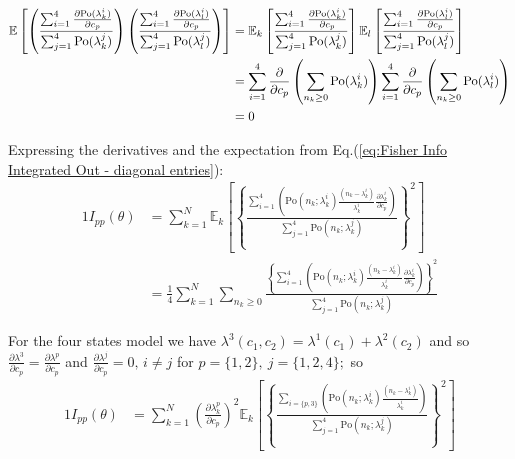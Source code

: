 \begin{alignat*}{1}
	\mathbb{E}\left[\left(\frac{\sum_{i=1}^{4}\frac{\partial\textrm{Po}(\textrm{\ensuremath{\lambda}}_{k}^{i})}{\partial c_{p}}}{\sum_{j=1}^{4}\textrm{Po}(\lambda_{k}^{j})}\right)\left(\frac{\sum_{i=1}^{4}\frac{\partial\textrm{Po}(\textrm{\ensuremath{\lambda}}_{l}^{i})}{\partial c_{p}}}{\sum_{j=1}^{4}\textrm{Po}(\lambda_{l}^{j})}\right)\right] & =\mathbb{E}_{k}\left[\frac{\sum_{i=1}^{4}\frac{\partial\textrm{Po}(\textrm{\ensuremath{\lambda}}_{k}^{i})}{\partial c_{p}}}{\sum_{j=1}^{4}\textrm{Po}(\lambda_{k}^{j})}\right]\mathbb{E}_{l}\left[\frac{\sum_{i=1}^{4}\frac{\partial\textrm{Po}(\textrm{\ensuremath{\lambda}}_{l}^{i})}{\partial c_{p}}}{\sum_{j=1}^{4}\textrm{Po}(\lambda_{l}^{j})}\right]\\
	 & =\sum_{i=1}^{4}\frac{\partial}{\partial c_{p}}\left(\sum_{n_{k}\geq0}\textrm{Po}(\textrm{\ensuremath{\lambda}}_{k}^{i})\right)\sum_{i=1}^{4}\frac{\partial}{\partial c_{p}}\left(\sum_{n_{k}\geq0}\textrm{Po}(\textrm{\ensuremath{\lambda}}_{l}^{i})\right)\\
	 & =0	
\end{alignat*}

Expressing the derivatives and the expectation from Eq.(\ref{eq:Fisher Info Integrated Out - diagonal entries}):
%
\begin{alignat*}{1}
	I_{pp}(\theta) & =\sum_{k=1}^{N}\mathbb{E}_{k}\left[\left\{ \frac{\sum_{i=1}^{4}\left(\mathrm{Po}(n_{k};\lambda_{k}^{i})\frac{(n_{k}-\lambda_{k}^{i})}{\lambda_{k}^{i}}\frac{\partial\lambda_{k}^{i}}{\partial c_{p}}\right)}{\sum_{j=1}^{4}\textrm{Po}(n_{k};\lambda_{k}^{j})}\right\} ^{2}\right]\\
	 & =\frac{1}{4}\sum_{k=1}^{N}\sum_{n_{k}\geq0}\frac{\left\{ \sum_{i=1}^{4}\left(\mathrm{Po}(n_{k};\lambda_{k}^{i})\frac{(n_{k}-\lambda_{k}^{i})}{\lambda_{k}^{i}}\frac{\partial\lambda_{k}^{i}}{\partial c_{p}}\right)\right\} ^{2}}{\sum_{j=1}^{4}\textrm{Po}(n_{k};\lambda_{k}^{j})}
\end{alignat*}

For the four states model we have $\lambda^{3}(c_{1},c_{2})=\lambda^{1}(c_{1})+\lambda^{2}(c_{2})$ and so $\frac{\partial\lambda^{3}}{\partial c_{p}}=\frac{\partial\lambda^{p}}{\partial c_{p}}$ and $\frac{\partial\lambda^{j}}{\partial c_{p}}=0,\, i\neq j$ for $p=\{1,2\},\: j=\{1,2,4\};$ so 
%
\begin{alignat*}{1}
	I_{pp}(\theta) & =\sum_{k=1}^{N}\left(\frac{\partial\lambda_{k}^{p}}{\partial c_{p}}\right)^{2}\mathbb{E}_{k}\left[\left\{ \frac{\sum_{i=\{p,3\}}\left(\mathrm{Po}(n_{k};\lambda_{k}^{i})\frac{(n_{k}-\lambda_{k}^{i})}{\lambda_{k}^{i}}\right)}{\sum_{j=1}^{4}\textrm{Po}(n_{k};\lambda_{k}^{j})}\right\} ^{2}\right]
\end{alignat*}

